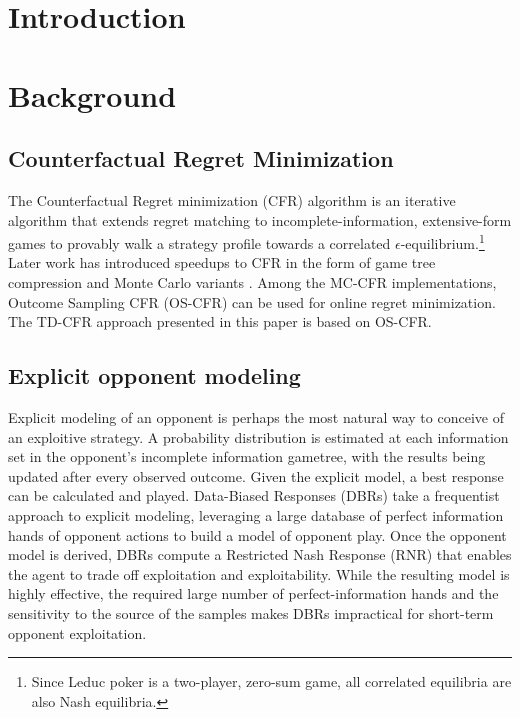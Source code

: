\documentclass{aamas2013}
\begin{document}





\section{Introduction}

\section{Background}


    \subsection{Counterfactual Regret Minimization}
    The Counterfactual Regret minimization (CFR) algorithm \cite{cfr} is an iterative algorithm that extends regret matching \cite{regretmatching} to incomplete-information, extensive-form games to provably walk a strategy profile towards a correlated $\epsilon$-equilibrium.\footnote{Since Leduc poker is a two-player, zero-sum game, all correlated equilibria are also Nash equilibria.} Later work has introduced speedups to CFR in the form of game tree compression \cite{pcs} and Monte Carlo variants \cite{mccfr}. Among the MC-CFR implementations, Outcome Sampling CFR (OS-CFR) can be used for online regret minimization. The TD-CFR approach presented in this paper is based on OS-CFR.
    
    \subsection{Explicit opponent modeling}
    Explicit modeling of an opponent is perhaps the most natural way to conceive of an exploitive strategy. A probability distribution is estimated at each information set in the opponent's incomplete information gametree, with the results being updated after every observed outcome. Given the explicit model, a best response can be calculated and played. Data-Biased Responses (DBRs) \cite{dbr} take a frequentist approach to explicit modeling, leveraging a large database of perfect information hands of opponent actions to build a model of opponent play. Once the opponent model is derived, DBRs compute a Restricted Nash Response (RNR) \cite{rnr} that enables the agent to trade off exploitation and exploitability. While the resulting model is highly effective, the required large number of perfect-information hands and the sensitivity to the source of the samples makes DBRs impractical for short-term opponent exploitation.
\end{document}
